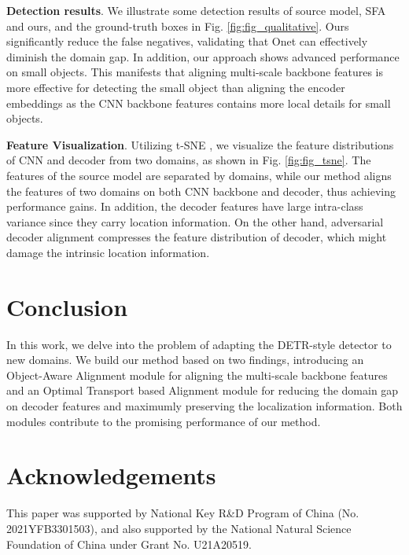 \documentclass[sigconf]{acmart}
\begin{document}
\textbf{Detection results}. We illustrate some detection results of source model, SFA \cite{wang2021exploring} and ours, and the ground-truth boxes in Fig. \ref{fig:fig_qualitative}. Ours significantly reduce the false negatives, validating that Onet can effectively diminish the domain gap. In addition, our approach shows advanced performance on small objects. This manifests that aligning multi-scale backbone features is more effective for detecting the small object than aligning the encoder embeddings as the CNN backbone features contains more local details for small objects.



\textbf{Feature Visualization}. Utilizing t-SNE \cite{tsne}, we visualize the feature distributions of CNN and decoder from two domains, as shown in Fig. \ref{fig:fig_tsne}. The features of the source model are separated by domains, while our method aligns the features of two domains on both CNN backbone and decoder, thus achieving performance gains. In addition, the decoder features have large intra-class variance since they carry location information. On the other hand, adversarial decoder alignment compresses the feature distribution of decoder, which might damage the intrinsic location information. 


 \section{Conclusion}
In this work, we delve into the problem of adapting the DETR-style detector to new domains. We build our method based on two findings, introducing an Object-Aware Alignment module for aligning the multi-scale backbone features and an Optimal Transport based Alignment module for reducing the domain gap on decoder features and maximumly preserving the localization information. Both modules contribute to the promising performance of our method. \vspace{-4mm}


\section*{Acknowledgements}
This paper was supported by National Key R\&D Program of China (No. 2021YFB3301503), and also supported by the National Natural Science Foundation of China under Grant No. U21A20519.

%
 


\balance

\end{document}
